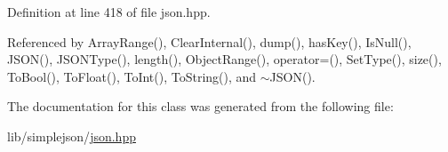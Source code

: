 Definition at line 418 of file json.\+hpp.



Referenced by Array\+Range(), Clear\+Internal(), dump(), has\+Key(), Is\+Null(), J\+S\+O\+N(), J\+S\+O\+N\+Type(), length(), Object\+Range(), operator=(), Set\+Type(), size(), To\+Bool(), To\+Float(), To\+Int(), To\+String(), and $\sim$\+J\+S\+O\+N().



The documentation for this class was generated from the following file\+:\begin{DoxyCompactItemize}
\item 
lib/simplejson/\mbox{\hyperlink{lib_2simplejson_2json_8hpp}{json.\+hpp}}\end{DoxyCompactItemize}
